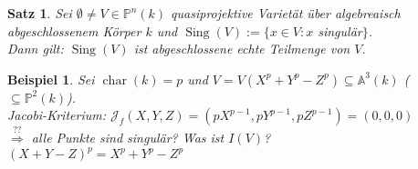 \documentclass[a4paper,12pt]{report}
\theoremstyle{break}
\newtheorem{Satz}{Satz}
\theoremstyle{nonumberbreak}
\newtheorem{nnBsp}{Beispiel}
\theoremstyle{nonumberplain}
\DeclareMathOperator{\Sing}{Sing}
\DeclareMathOperator{\chara}{char}
\newcommand{\A}{\mathbb{A}}
\newcommand{\IP}{\mathbb{P}}%
\newcommand{\calJ}{\mathcal{J}}
\begin{document}
\begin{Satz}
Sei $\emptyset\ne V\in \IP^n(k)$ quasiprojektive Variet\"at \"uber algebreaisch abgeschlossenem K\"orper $k$ und $\Sing(V):=\{x\in V: x$ singul\"ar$\}$.\\
Dann gilt: $\Sing(V)$ ist abgeschlossene echte Teilmenge von $V$.
\end{Satz}

\begin{nnBsp}
Sei $\chara(k)=p$ und $V=V(X^p+Y^p-Z^p)\subseteq\A^3(k)$ ($\subseteq\IP^2(k)$).\\
Jacobi-Kriterium: $\calJ_f(X,Y,Z)=(pX^{p-1}, pY^{p-1}, pZ^{p-1})=(0,0,0)$\\
$\overset{??}{\Rightarrow}$ alle Punkte sind singul\"ar? Was ist $I(V)$?\\
$(X+Y-Z)^p=X^p+Y^p-Z^p$
\end{nnBsp}

\end{document}
